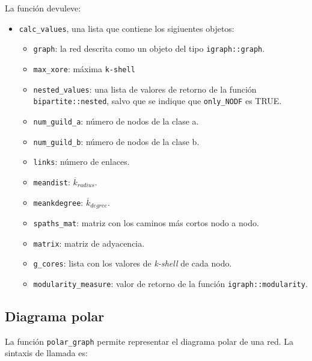 La función devuleve:
\begin{itemize}
\item \texttt{calc\_values}, una lista que contiene los sigiuentes objetos:
   \begin{itemize}
   
\item \texttt{graph}: la red descrita como un objeto del tipo \texttt{igraph::graph}.

\item \texttt{max\_xore}: máxima \texttt{k-shell}

\item \texttt{nested\_values}: una lista de valores de retorno de la función \texttt{bipartite::nested}, salvo que se indique que \texttt{only\_NODF} es TRUE.

\item \texttt{num\_guild\_a}: número de nodos de la clase a.

\item \texttt{num\_guild\_b}: número de nodos de la clase b.

\item \texttt{links}: número de enlaces.

\item \texttt{meandist}: $\overline {k}_{radius}$.

\item \texttt{meankdegree}:  $\overline {k}_{degree}$.

\item \texttt{spaths\_mat}: matriz con los caminos más cortos nodo a nodo.

\item \texttt{matrix}: matriz de adyacencia.

\item \texttt{g\_cores}: lista con los valores de \textit{k-shell} de cada nodo.

\item \texttt{modularity\_measure}: valor de retorno de la función \texttt{igraph::modularity}.
   \end{itemize}


\end{itemize}

\subsection*{Diagrama polar}
\label{polar_plot}

La función \texttt{polar\_graph} permite representar el diagrama polar de una red. La sintaxis de llamada es:

